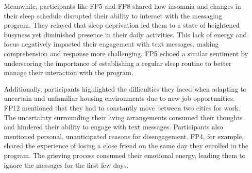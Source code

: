 
Meanwhile, participants like FP5 and FP8 shared how insomnia and changes in their sleep schedule disrupted their ability to interact with the messaging program. They relayed that sleep deprivation led them to a state of heightened busyness yet diminished presence in their daily activities. This lack of energy and focus negatively impacted their engagement with text messages, making comprehension and response more challenging. FP5 echoed a similar sentiment by underscoring the importance of establishing a regular sleep routine to better manage their interaction with the program.



Additionally, participants highlighted the difficulties they faced when adapting to uncertain and unfamiliar housing environments due to new job opportunities. FP12 mentioned that they had to constantly move between two cities for work. The uncertainty surrounding their living arrangements consumed their thoughts and hindered their ability to engage with text messages. Participants also mentioned personal, unanticipated reasons for disengagement. FP4, for example, shared the experience of losing a close friend on the same day they enrolled in the program. The grieving process consumed their emotional energy, leading them to ignore the messages for the first few days.

